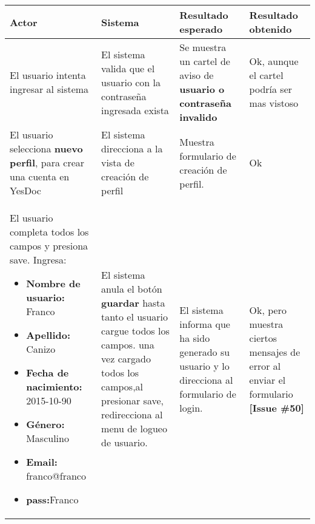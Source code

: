   {\scriptsize
  \begin{longtable}{|m{3.5cm}|m{3.5cm}|m{3.5cm}|m{2.5cm}|}
  	\hline
  	\textbf{Actor}  & \textbf{Sistema}& \textbf{Resultado esperado} & \textbf{Resultado obtenido} \\ \hline
  	\endhead
  	
  	El usuario intenta ingresar al sistema & El sistema valida que el usuario con la contraseña ingresada exista 
  	& Se muestra un cartel de aviso de \textbf{usuario o contraseña invalido} 
  	& Ok, aunque el cartel podría ser mas vistoso 
  	\\ \hline
  	
  	
  	
  	El usuario selecciona \textbf{nuevo perfil}, para
  	crear una cuenta en YesDoc 
  	& El sistema direcciona a la vista de creación de perfil
  	& Muestra formulario de creación de perfil.
  	& Ok
  	\\ \hline
  	
  	
  	
  	El usuario completa todos los campos y presiona save.
  	Ingresa:
  	\begin{itemize}
  		\item \textbf{Nombre de usuario:} Franco
  		\item \textbf{Apellido:} Canizo
  		\item \textbf{Fecha de nacimiento: }2015-10-90
  		\item \textbf{Género: }Masculino
  		\item \textbf{Email: }franco@franco
  		\item \textbf{pass:}Franco
  		
  	\end{itemize}
  	& El sistema anula el botón \textbf{guardar }hasta tanto el usuario cargue todos los campos. una vez cargado todos los campos,al presionar save, redirecciona al menu
  	de logueo de usuario.
  	& El sistema informa que ha sido generado su usuario y lo direcciona al formulario de login.
  	& Ok, pero muestra ciertos mensajes de error al enviar el formulario \textbf{[Issue \#50]}
  	\\ \hline
  	
  	
  	

\end{longtable}}
